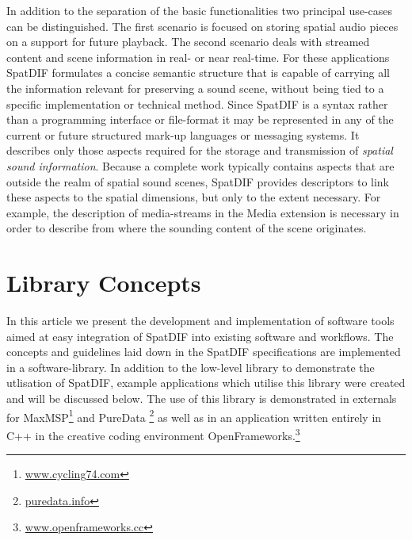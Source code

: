 \documentclass{article}
\begin{document}
In addition to the separation of the basic functionalities two principal use-cases can be distinguished.
The first scenario is focused on storing spatial audio pieces on a support for future playback. 
The second scenario deals with streamed content and scene information in real- or near real-time.
For these applications SpatDIF formulates a concise semantic structure that is capable of carrying all the information relevant for preserving a sound scene, without being tied to a specific implementation or technical method.
Since SpatDIF is a syntax rather than a programming interface or file-format it may be represented in any of the current or future structured mark-up languages or messaging systems.
It describes only those aspects required for the storage and transmission of \emph{spatial sound information}.
Because a complete work typically contains aspects that are outside the realm of spatial sound scenes, SpatDIF provides descriptors to link these aspects to the spatial dimensions, but only to the extent necessary.
For example, the description of media-streams in the Media extension is necessary in order to describe from where the sounding content of the scene originates.

\section{Library Concepts}\label{sec:libspatdif_concepts}

In this article we present the development and implementation of software tools aimed at easy integration of SpatDIF into existing software and workflows.
The concepts and guidelines laid down in the SpatDIF specifications are implemented in a software-library.
In addition to the low-level library to demonstrate the utlisation of SpatDIF, example applications which utilise this library were created and will be discussed below.
The use of this library is demonstrated in externals for MaxMSP\footnote{\href{http://www.cycling74.com}{www.cycling74.com}} and PureData \footnote{\href{http://puredata.info}{puredata.info}} as well as in an application written entirely in C++ in the creative coding environment OpenFrameworks.\footnote{\href{http://www.openframeworks.cc}{www.openframeworks.cc}}
\end{document}
